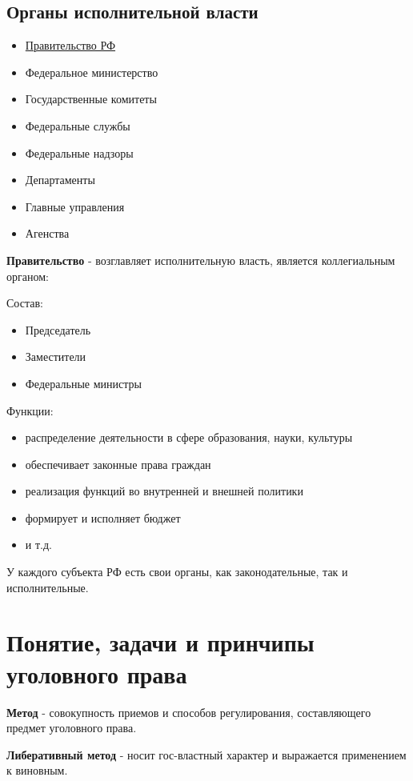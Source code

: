 \documentclass[a5paper,10pt]{article}
\begin{document}
		\subsection{Органы исполнительной власти}
			\begin{itemize}[itemsep=0pt]
				\item \underline{Правительство РФ}
				\item Федеральное министерство
				\item Государственные комитеты
				\item Федеральные службы
				\item Федеральные надзоры
				\item Департаменты
				\item Главные управления
				\item Агенства
			\end{itemize}

			\textbf{Правительство} - возглавляет исполнительную власть, является коллегиальным органом:
			
			Состав:
			\begin{itemize}[itemsep=0pt]
				\item Председатель
				\item Заместители
				\item Федеральные министры
			\end{itemize}

			Функции:
			\begin{itemize}[itemsep=0pt]
				\item распределение деятельности в сфере образования, науки, культуры
				\item обеспечивает законные права граждан
				\item реализация функций во внутренней и внешней политики
				\item формирует и исполняет бюджет
				\item и т.д.
			\end{itemize}

			У каждого субъекта РФ есть свои органы, как законодательные, так и исполнительные.

	\section{Понятие, задачи и принчипы уголовного права}
		\textbf{Метод} - совокупность приемов и способов регулирования, составляющего предмет уголовного права.

		\textbf{Либеративный метод} - носит гос-властный характер и выражается применением к виновным.
\end{document}

